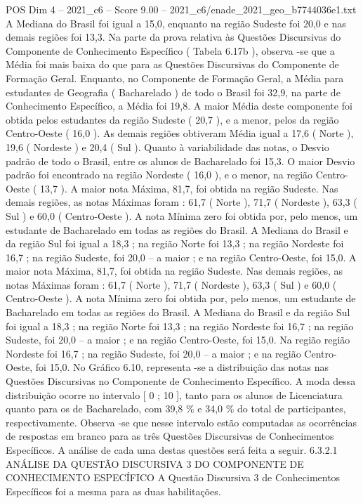 \begin{textsample}{POS Dim 4 – 2021\_c6 – Score 9.00 – 2021\_c6/enade\_2021\_geo\_b7744036e1.txt}
A Mediana do Brasil foi igual a 15,0, enquanto na região Sudeste foi 20,0 e nas demais regiões foi 13,3.
Na parte da prova relativa às Questões Discursivas do Componente de Conhecimento Específico ( Tabela 6.17b ), observa -se que a Média foi mais baixa do que para as Questões Discursivas do Componente de Formação Geral.
Enquanto, no Componente de Formação Geral, a Média para estudantes de Geografia ( Bacharelado ) de todo o Brasil foi 32,9, na parte de Conhecimento Específico, a Média foi 19,8.
A maior Média deste componente foi obtida pelos estudantes da região Sudeste ( 20,7 ), e a menor, pelos da região Centro-Oeste ( 16,0 ).
As demais regiões obtiveram Média igual a 17,6 ( Norte ), 19,6 ( Nordeste ) e 20,4 ( Sul ).
Quanto à variabilidade das notas, o Desvio padrão de todo o Brasil, entre os alunos de Bacharelado foi 15,3.
O maior Desvio padrão foi encontrado na região Nordeste ( 16,0 ), e o menor, na região Centro-Oeste ( 13,7 ).
A maior nota Máxima, 81,7, foi obtida na região Sudeste.
Nas demais regiões, as notas Máximas foram : 61,7 ( Norte ), 71,7 ( Nordeste ), 63,3 ( Sul ) e 60,0 ( Centro-Oeste ).
A nota Mínima zero foi obtida por, pelo menos, um estudante de Bacharelado em todas as regiões do Brasil.
A Mediana do Brasil e da região Sul foi igual a 18,3 ; na região Norte foi 13,3 ; na região Nordeste foi 16,7 ; na região Sudeste, foi 20,0 – a maior ; e na região Centro-Oeste, foi 15,0.
A maior nota Máxima, 81,7, foi obtida na região Sudeste.
Nas demais regiões, as notas Máximas foram : 61,7 ( Norte ), 71,7 ( Nordeste ), 63,3 ( Sul ) e 60,0 ( Centro-Oeste ).
A nota Mínima zero foi obtida por, pelo menos, um estudante de Bacharelado em todas as regiões do Brasil.
A Mediana do Brasil e da região Sul foi igual a 18,3 ; na região Norte foi 13,3 ; na região Nordeste foi 16,7 ; na região Sudeste, foi 20,0 – a maior ; e na região Centro-Oeste, foi 15,0.
Na região região Nordeste foi 16,7 ; na região Sudeste, foi 20,0 – a maior ; e na região Centro-Oeste, foi 15,0.
No Gráfico 6.10, representa -se a distribuição das notas nas Questões Discursivas no Componente de Conhecimento Específico.
A moda dessa distribuição ocorre no intervalo [ 0 ; 10 ], tanto para os alunos de Licenciatura quanto para os de Bacharelado, com 39,8 \% e 34,0 \% do total de participantes, respectivamente.
Observa -se que nesse intervalo estão computadas as ocorrências de respostas em branco para as três Questões Discursivas de Conhecimentos Específicos.
A análise de cada uma destas questões será feita a seguir. 6.3.2.1 ANÁLISE DA QUESTÃO DISCURSIVA 3 DO COMPONENTE DE CONHECIMENTO ESPECÍFICO A Questão Discursiva 3 de Conhecimentos Específicos foi a mesma para as duas habilitações.

\end{textsample}
